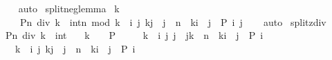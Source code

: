 \begin{isabellebody}
%
\isadelimproof
\ \ %
\endisadelimproof
%
\isatagproof
{}\isamarkupfalse%
\ auto%
\endisatagproof
{\isafoldproof}%
%
\isadelimproof
\isanewline
%
\endisadelimproof
\isanewline
{}\isamarkupfalse%
\ split{\isacharunderscore}{\kern0pt}neg{\isacharunderscore}{\kern0pt}lemma{\isacharcolon}{\kern0pt}\isanewline
\ {\isachardoublequoteopen}k{\isacharless}{\kern0pt}{}\ {\isasymLongrightarrow}\isanewline
\ \ \ \ P{\isacharparenleft}{\kern0pt}n\ div\ k\ {\isacharcolon}{\kern0pt}{\isacharcolon}{\kern0pt}\ int{\isacharparenright}{\kern0pt}{\isacharparenleft}{\kern0pt}n\ mod\ k{\isacharparenright}{\kern0pt}\ {\isacharequal}{\kern0pt}\ {\isacharparenleft}{\kern0pt}{\isasymforall}i\ j{\isachardot}{\kern0pt}\ k{\isacharless}{\kern0pt}j\ {\isasymand}\ j{\isasymle}{}\ {\isasymand}\ n\ {\isacharequal}{\kern0pt}\ k{\isacharasterisk}{\kern0pt}i\ {\isacharplus}{\kern0pt}\ j\ {\isasymlongrightarrow}\ P\ i\ j{\isacharparenright}{\kern0pt}{\isachardoublequoteclose}\isanewline
%
\isadelimproof
\ \ %
\endisadelimproof
%
\isatagproof
{}\isamarkupfalse%
\ auto%
\endisatagproof
{\isafoldproof}%
%
\isadelimproof
\isanewline
%
\endisadelimproof
\isanewline
{}\isamarkupfalse%
\ split{\isacharunderscore}{\kern0pt}zdiv{\isacharcolon}{\kern0pt}\isanewline
\ {\isachardoublequoteopen}P{\isacharparenleft}{\kern0pt}n\ div\ k\ {\isacharcolon}{\kern0pt}{\isacharcolon}{\kern0pt}\ int{\isacharparenright}{\kern0pt}\ {\isacharequal}{\kern0pt}\isanewline
\ \ {\isacharparenleft}{\kern0pt}{\isacharparenleft}{\kern0pt}k\ {\isacharequal}{\kern0pt}\ {}\ {\isasymlongrightarrow}\ P\ {}{\isacharparenright}{\kern0pt}\ {\isasymand}\isanewline
\ \ \ {\isacharparenleft}{\kern0pt}{}{\isacharless}{\kern0pt}k\ {\isasymlongrightarrow}\ {\isacharparenleft}{\kern0pt}{\isasymforall}i\ j{\isachardot}{\kern0pt}\ {}{\isasymle}j\ {\isasymand}\ j{\isacharless}{\kern0pt}k\ {\isasymand}\ n\ {\isacharequal}{\kern0pt}\ k{\isacharasterisk}{\kern0pt}i\ {\isacharplus}{\kern0pt}\ j\ {\isasymlongrightarrow}\ P\ i{\isacharparenright}{\kern0pt}{\isacharparenright}{\kern0pt}\ {\isasymand}\isanewline
\ \ \ {\isacharparenleft}{\kern0pt}k{\isacharless}{\kern0pt}{}\ {\isasymlongrightarrow}\ {\isacharparenleft}{\kern0pt}{\isasymforall}i\ j{\isachardot}{\kern0pt}\ k{\isacharless}{\kern0pt}j\ {\isasymand}\ j{\isasymle}{}\ {\isasymand}\ n\ {\isacharequal}{\kern0pt}\ k{\isacharasterisk}{\kern0pt}i\ {\isacharplus}{\kern0pt}\ j\ {\isasymlongrightarrow}\ P\ i{\isacharparenright}{\kern0pt}{\isacharparenright}{\kern0pt}{\isacharparenright}{\kern0pt}{\isachardoublequoteclose}\isanewline

\end{isabellebody}
